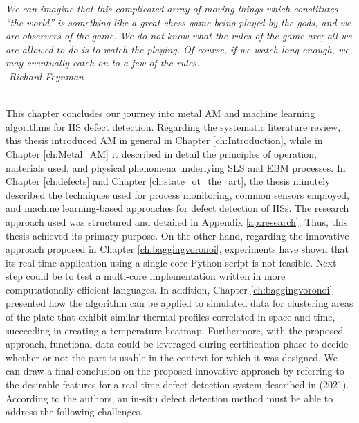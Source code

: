 \begin{minipage}{0.7\textwidth}
\small
			\textit{We can imagine that this complicated array of moving things which constitutes “the world” is something like a great chess game being played by the gods, and we are observers of the game. We do not know what the rules of the game are; all we are allowed to do is to watch the playing. Of course, if we watch long enough, we may eventually catch on to a few of the rules.
            \\[1.3ex]
            -Richard Feynman}
\end{minipage}
\\[1cm]
This chapter concludes our journey into metal AM and machine learning algorithms for HS defect detection. Regarding the systematic literature review, this thesis introduced AM in general in Chapter \ref{ch:Introduction}, while in Chapter \ref{ch:Metal_AM} it described in detail the principles of operation, materials used, and physical phenomena underlying SLS and EBM processes. In Chapter \ref{ch:defects} and Chapter \ref{ch:state_ot_the_art}, the thesis minutely described the techniques used for process monitoring, common sensors employed, and machine learning-based approaches for defect detection of HSs. The research approach used was structured and detailed in Appendix \ref{ap:research}. Thus, this thesis achieved its primary purpose.
On the other hand, regarding the innovative approach proposed in Chapter \ref{ch:baggingvoronoi}, experiments have shown that its real-time application using a single-core Python script is not feasible. Next step could be to test a multi-core implementation written in more computationally efficient languages. In addition, Chapter \ref{ch:baggingvoronoi} presented how the algorithm can be applied to simulated data for clustering areas of the plate that exhibit similar thermal profiles correlated in space and time, succeeding in creating a temperature heatmap. Furthermore, with the proposed approach, functional data could be leveraged during certification phase to decide whether or not the part is usable in the context for which it was designed. We can draw a final conclusion on the proposed innovative approach by referring to the desirable features for a real-time defect detection system described in \cite{yan_real-time_2021} (2021).
According to the authors, an in-situ defect detection method must be able to address the following challenges.
